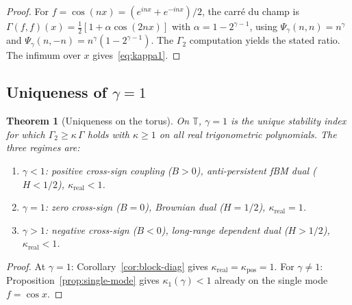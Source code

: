 \documentclass[11pt,a4paper]{article}
\theoremstyle{plain}
\newtheorem{theorem}{Theorem}[section]
\theoremstyle{definition}
\theoremstyle{remark}
\newcommand{\T}{\mathbb{T}}
\begin{document}
\begin{proof}
For $f = \cos(nx) = (e^{inx} + e^{-inx})/2$, the carr\'e du champ is
$\Gamma(f,f)(x) = \tfrac{1}{2}[1 + \alpha\cos(2nx)]$
with $\alpha = 1 - 2^{\gamma-1}$,
using $\Psi_\gamma(n,n) = n^\gamma$ and
$\Psi_\gamma(n,-n) = n^\gamma(1 - 2^{\gamma-1})$.
The $\Gamma_2$ computation yields the stated ratio.
The infimum over $x$ gives~\eqref{eq:kappa1}.
\end{proof}


\subsection{Uniqueness of $\gamma = 1$}

\begin{theorem}[Uniqueness on the torus]\label{thm:uniqueness}
On $\T$, $\gamma = 1$ is the unique stability index for which
$\Gamma_2 \geq \kappa\,\Gamma$ holds with $\kappa \geq 1$
on all real trigonometric polynomials. The three regimes are:
\begin{enumerate}[label=(\roman*)]
\item $\gamma < 1$: positive cross-sign coupling ($B > 0$),
  anti-persistent fBM dual ($H < 1/2$), $\kappa_{\mathrm{real}} < 1$.
\item $\gamma = 1$: zero cross-sign ($B = 0$),
  Brownian dual ($H = 1/2$), $\kappa_{\mathrm{real}} = 1$.
\item $\gamma > 1$: negative cross-sign ($B < 0$),
  long-range dependent dual ($H > 1/2$), $\kappa_{\mathrm{real}} < 1$.
\end{enumerate}
\end{theorem}

\begin{proof}
At $\gamma = 1$: Corollary~\ref{cor:block-diag} gives
$\kappa_{\mathrm{real}} = \kappa_{\mathrm{pos}} = 1$.
For $\gamma \neq 1$: Proposition~\ref{prop:single-mode} gives
$\kappa_1(\gamma) < 1$ already on the single mode $f = \cos x$.
\end{proof}
\end{document}
